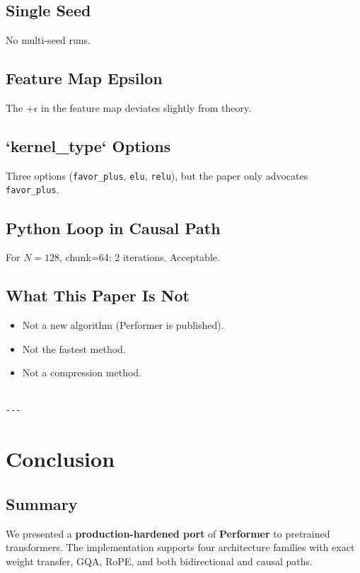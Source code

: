 \subsection{Single Seed}

No multi-seed runs.

\subsection{Feature Map Epsilon}

The $+\epsilon$ in the feature map deviates slightly from theory.

\subsection{`kernel\_type` Options}

Three options (\texttt{favor\_plus}, \texttt{elu}, \texttt{relu}), but the paper only advocates 
\texttt{favor\_plus}.

\subsection{Python Loop in Causal Path}

For $N = 128$, chunk=64: 2 iterations. Acceptable.

\subsection{What This Paper Is Not}

\begin{itemize}
\item Not a new algorithm (Performer is published).
\item Not the fastest method.
\item Not a compression method.
\end{itemize}
\begin{lstlisting}

---
\end{lstlisting}


\section{Conclusion}

\subsection{Summary}

We presented a \textbf{production-hardened port} of \textbf{Performer} to pretrained 
transformers. The implementation supports four architecture families with 
exact weight transfer, GQA, RoPE, and both bidirectional and causal paths.

